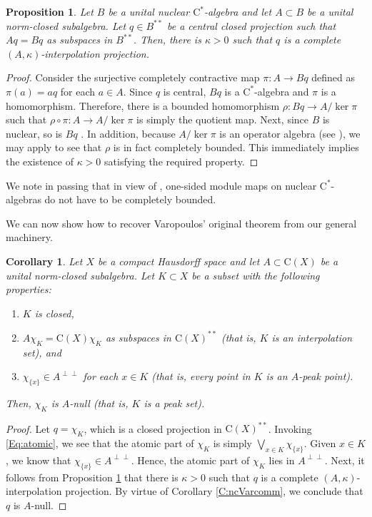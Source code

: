 \documentclass[10pt]{amsart}
\newcommand{\rC}{\mathrm{C}}
\newtheorem{proposition}[lemma]{Proposition}
\newtheorem{corollary}[lemma]{Corollary}
\theoremstyle{definition}
\begin{document}
\begin{proposition}\label{P:interpnuclear}
Let $B$ be a unital nuclear $\rC^*$-algebra and let $A\subset B$ be a unital norm-closed subalgebra. Let $q\in B^{**}$ be a central closed projection such that $Aq=Bq$ as subspaces in $B^{**}$. Then, there is $\kappa>0$ such that $q$ is a complete $(A,\kappa)$-interpolation projection.
\end{proposition}
\begin{proof}
Consider the surjective completely contractive  map $\pi:A\to Bq$ defined as $\pi(a)=aq$ for each $a\in A$. Since $q$ is central, $Bq$ is a $\rC^*$-algebra and $\pi$ is a homomorphism. Therefore, there is a bounded homomorphism $\rho:Bq\to A/\ker \pi$ such that $\rho\circ \pi:A\to A/\ker \pi$ is simply the quotient map. Next, since $B$ is nuclear, 
so is $Bq$ \cite[Corollary 9.4.4]{BO2008}.  In addition, because $A/\ker \pi$ is an operator algebra (see \cite[Proposition 2.3.4]{BLM2004}), we may 
apply \cite[Theorem 4.1]{christensen1981} to see that $\rho$ is in fact completely bounded. This immediately implies the existence of $\kappa>0$ satisfying the required property. 
\end{proof}


We note in passing that in view of \cite{LT2012}, one-sided module maps on nuclear $\rC^*$-algebras do not have to be completely bounded.


 
We can now show how to recover Varopoulos' original theorem from our general machinery. 
 
 \begin{corollary}\label{C:Varopoulos}
 Let $X$ be a compact Hausdorff space and let $A\subset \rC(X)$ be a unital norm-closed subalgebra. Let $K\subset X$ be a subset with  the following properties:
\begin{enumerate}[{\rm (i)}]
\item $K$ is closed,
\item $A\chi_K=\rC(X)\chi_K$ as subspaces in $\rC(X)^{**}$ 
(that is, $K$ is an interpolation set), and 
\item $\chi_{\{x\}}\in A^{\perp\perp}$ for each $x\in K$
(that is, every point in $K$ is an $A$-peak point). 
\end{enumerate}
Then, $\chi_K$ is $A$-null (that is, $K$ is a peak set).
 \end{corollary}
 \begin{proof}
Let $q=\chi_K$, which is a closed projection in $\rC(X)^{**}$.  Invoking \eqref{Eq:atomic}, we see that the atomic part of $\chi_K$ is simply $\bigvee_{x\in K}\chi_{\{x\}}$. Given $x\in K$, we know that $\chi_{\{x\}}\in A^{\perp\perp}$. 
Hence, the atomic part of $\chi_K$ lies in $A^{\perp\perp}$. Next, it follows from Proposition \ref{P:interpnuclear} that there is $\kappa>0$ such that $q$ is a complete $(A,\kappa)$-interpolation projection. 
By virtue of Corollary \ref{C:ncVarcomm}, we conclude that $q$ is $A$-null.
 \end{proof}
 
\end{document}
